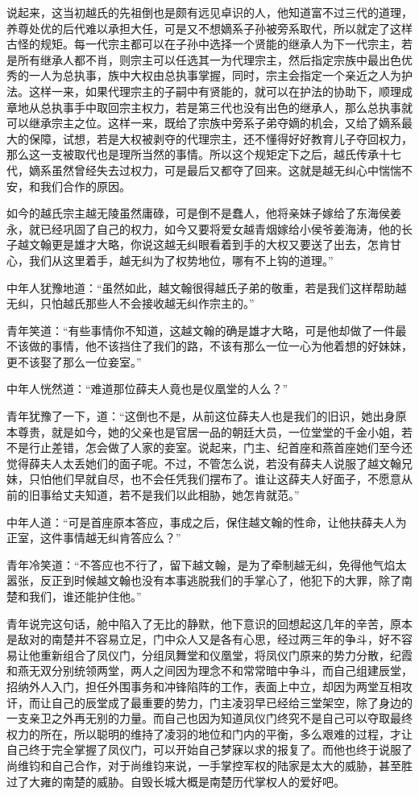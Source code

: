 说起来，这当初越氏的先祖倒也是颇有远见卓识的人，他知道富不过三代的道理，养尊处优的后代难以承担大任，可是又不想嫡系子孙被旁系取代，所以就定了这样古怪的规矩。每一代宗主都可以在子孙中选择一个贤能的继承人为下一代宗主，若是所有继承人都不肖，则宗主可以任选其一为代理宗主，然后指定宗族中最出色优秀的一人为总执事，族中大权由总执事掌握，同时，宗主会指定一个亲近之人为护法。这样一来，如果代理宗主的子嗣中有贤能的，就可以在护法的协助下，顺理成章地从总执事手中取回宗主权力，若是第三代也没有出色的继承人，那么总执事就可以继承宗主之位。这样一来，既给了宗族中旁系子弟夺嫡的机会，又给了嫡系最大的保障，试想，若是大权被剥夺的代理宗主，还不懂得好好教育儿子夺回权力，那么这一支被取代也是理所当然的事情。所以这个规矩定下之后，越氏传承十七代，嫡系虽然曾经失去过权力，可是最后又都夺了回来。这就是越无纠心中惴惴不安，和我们合作的原因。

如今的越氏宗主越无陵虽然庸碌，可是倒不是蠢人，他将亲妹子嫁给了东海侯姜永，就已经巩固了自己的权力，如今又要将爱女越青烟嫁给小侯爷姜海涛，他的长子越文翰更是雄才大略，你说这越无纠眼看着到手的大权又要送了出去，怎肯甘心，我们从这里着手，越无纠为了权势地位，哪有不上钩的道理。”

中年人犹豫地道：“虽然如此，越文翰很得越氏子弟的敬重，若是我们这样帮助越无纠，只怕越氏那些人不会接收越无纠作宗主的。”

青年笑道：“有些事情你不知道，这越文翰的确是雄才大略，可是他却做了一件最不该做的事情，他不该挡住了我们的路，不该有那么一位一心为他着想的好妹妹，更不该娶了那么一位妾室。”

中年人恍然道：“难道那位薛夫人竟也是仪凰堂的人么？”

青年犹豫了一下，道：“这倒也不是，从前这位薛夫人也是我们的旧识，她出身原本尊贵，就是如今，她的父亲也是官居一品的朝廷大员，一位堂堂的千金小姐，若不是行止差错，怎会做了人家的妾室。说起来，门主、纪首座和燕首座她们至今还觉得薛夫人太丢她们的面子呢。不过，不管怎么说，若没有薛夫人说服了越文翰兄妹，只怕他们早就自尽，也不会任凭我们摆布了。谁让这薛夫人好面子，不愿意从前的旧事给丈夫知道，若不是我们以此相胁，她怎肯就范。”

中年人道：“可是首座原本答应，事成之后，保住越文翰的性命，让他扶薛夫人为正室，这件事情越无纠肯答应么？”

青年冷笑道：“不答应也不行了，留下越文翰，是为了牵制越无纠，免得他气焰太嚣张，反正到时候越文翰也没有本事逃脱我们的手掌心了，他犯下的大罪，除了南楚和我们，谁还能护住他。”

青年说完这句话，舱中陷入了无比的静默，他下意识的回想起这几年的辛苦，原本是敌对的南楚并不容易立足，门中众人又是各有心思，经过两三年的争斗，好不容易让他重新组合了凤仪门，分组凤舞堂和仪凰堂，将凤仪门原来的势力分散，纪霞和燕无双分别统领两堂，两人之间因为理念不和常常暗中争斗，而自己组建辰堂，招纳外人入门，担任外围事务和冲锋陷阵的工作，表面上中立，却因为两堂互相攻讦，而让自己的辰堂成了最重要的势力，门主凌羽早已经给三堂架空，除了身边的一支亲卫之外再无别的力量。而自己也因为知道凤仪门终究不是自己可以夺取最终权力的所在，所以聪明的维持了凌羽的地位和门内的平衡，多么艰难的过程，才让自己终于完全掌握了凤仪门，可以开始自己梦寐以求的报复了。而他也终于说服了尚维钧和自己合作，对于尚维钧来说，一手掌控军权的陆家是太大的威胁，甚至胜过了大雍的南楚的威胁。自毁长城大概是南楚历代掌权人的爱好吧。

